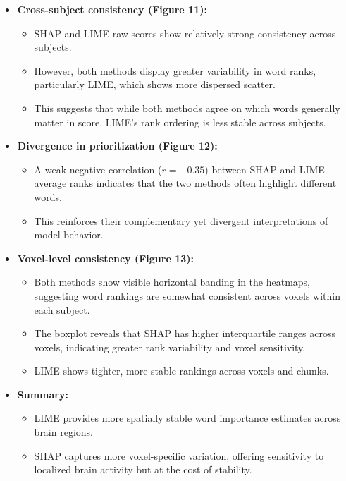 \begin{itemize}
    \item \textbf{Cross-subject consistency (Figure 11):}
    \begin{itemize}
        \item SHAP and LIME raw scores show relatively strong consistency across subjects.
        \item However, both methods display greater variability in word ranks, particularly LIME, which shows more dispersed scatter.
        \item This suggests that while both methods agree on which words generally matter in score, LIME's rank ordering is less stable across subjects.
    \end{itemize}

    \item \textbf{Divergence in prioritization (Figure 12):}
    \begin{itemize}
        \item A weak negative correlation ($r = -0.35$) between SHAP and LIME average ranks indicates that the two methods often highlight different words.
        \item This reinforces their complementary yet divergent interpretations of model behavior.
    \end{itemize}

    \item \textbf{Voxel-level consistency (Figure 13):}
    \begin{itemize}
        \item Both methods show visible horizontal banding in the heatmaps, suggesting word rankings are somewhat consistent across voxels within each subject.
        \item The boxplot reveals that SHAP has higher interquartile ranges across voxels, indicating greater rank variability and voxel sensitivity.
        \item LIME shows tighter, more stable rankings across voxels and chunks.
    \end{itemize}

    \item \textbf{Summary:} 
    \begin{itemize}
        \item LIME provides more spatially stable word importance estimates across brain regions.
        \item SHAP captures more voxel-specific variation, offering sensitivity to localized brain activity but at the cost of stability.
    \end{itemize}
\end{itemize}

